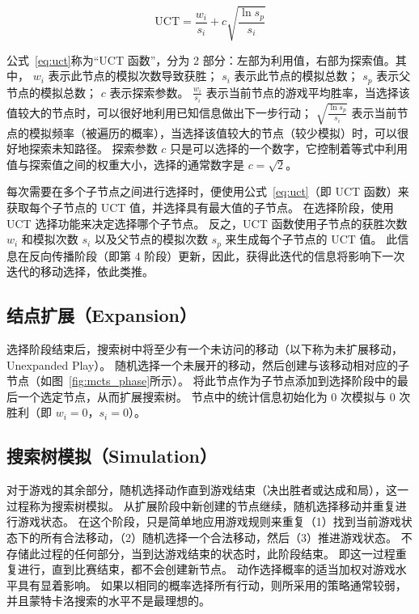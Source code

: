 \documentclass[UTF8,cs4size]{ctexart}
\begin{document}
\begin{equation}
  \text{UCT} = \frac{w_i}{s_i} + c\sqrt{\frac{\ln{s_p}}{s_i}}
  \label{eq:uct}
\end{equation}

公式~\eqref{eq:uct}称为“UCT 函数”，分为 2 部分：左部为利用值，右部为探索值。其中，
$w_i$ 表示此节点的模拟次数导致获胜；
$s_i$ 表示此节点的模拟总数；
$s_p$ 表示父节点的模拟总数；
$c$ 表示探索参数。
$\frac{w_i}{s_i}$ 表示当前节点的游戏平均胜率，当选择该值较大的节点时，可以很好地利用已知信息做出下一步行动；
$\sqrt{\frac{\ln{s_p}}{s_i}}$ 表示当前节点的模拟频率（被遍历的概率），当选择该值较大的节点（较少模拟）时，可以很好地探索未知路径。
探索参数 $c$ 只是可以选择的一个数字，它控制着等式中利用值与探索值之间的权重大小，选择的通常数字是 $c = \sqrt{2}$。

每次需要在多个子节点之间进行选择时，便使用公式~\eqref{eq:uct}（即 UCT 函数）来获取每个子节点的 UCT 值，并选择具有最大值的子节点。
在选择阶段，使用 UCT 选择功能来决定选择哪个子节点。
反之，UCT 函数使用子节点的获胜次数 $w_i$ 和模拟次数 $s_i$ 以及父节点的模拟次数 $s_p$ 来生成每个子节点的 UCT 值。
此信息在反向传播阶段（即第 4 阶段）更新，因此，获得此迭代的信息将影响下一次迭代的移动选择，依此类推。

\subsection{结点扩展（Expansion）}
选择阶段结束后，搜索树中将至少有一个未访问的移动（以下称为未扩展移动，Unexpanded Play）。
随机选择一个未展开的移动，然后创建与该移动相对应的子节点（如图~\ref{fig:mcts_phase}所示）。
将此节点作为子节点添加到选择阶段中的最后一个选定节点，从而扩展搜索树。
节点中的统计信息初始化为 0 次模拟与 0 次胜利（即 $w_i = 0$，$s_i = 0$）。

\subsection{搜索树模拟（Simulation）}
对于游戏的其余部分，随机选择动作直到游戏结束（决出胜者或达成和局），这一过程称为搜索树模拟。
从扩展阶段中新创建的节点继续，随机选择移动并重复进行游戏状态。
在这个阶段，只是简单地应用游戏规则来重复（1）找到当前游戏状态下的所有合法移动，（2）随机选择一个合法移动，然后（3）推进游戏状态。
不存储此过程的任何部分，当到达游戏结束的状态时，此阶段结束。
即这一过程重复进行，直到比赛结束，都不会创建新节点。
动作选择概率的适当加权对游戏水平具有显着影响。
如果以相同的概率选择所有行动，则所采用的策略通常较弱，并且蒙特卡洛搜索的水平不是最理想的。
\end{document}
